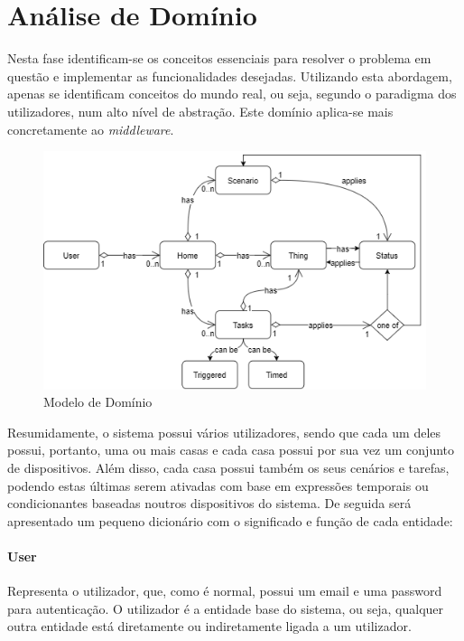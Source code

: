 \section{Análise de Domínio}

Nesta fase identificam-se os conceitos essenciais para resolver o problema em questão e implementar as funcionalidades desejadas. Utilizando esta abordagem, apenas se identificam conceitos do mundo real, ou seja, segundo o paradigma dos utilizadores, num alto nível de abstração. Este domínio aplica-se mais concretamente ao  \textit{middleware}.

\begin{figure}[H]
  \centering
        \includegraphics[scale=0.8]{img/domain.png}
  \caption{Modelo de Domínio}
\end{figure}

Resumidamente, o sistema possui vários utilizadores, sendo que cada um deles possui, portanto, uma ou mais casas e cada casa possui por sua vez um conjunto de dispositivos. Além disso, cada casa possui também os seus cenários e tarefas, podendo estas últimas serem ativadas com base em expressões temporais ou condicionantes baseadas noutros dispositivos do sistema. De seguida será apresentado um pequeno dicionário com o significado e função de cada entidade:

\paragraph*{User}
Representa o utilizador, que, como é normal, possui um email e uma password para autenticação. O utilizador é a entidade base do sistema, ou seja, qualquer outra entidade está diretamente ou indiretamente ligada a um utilizador.

